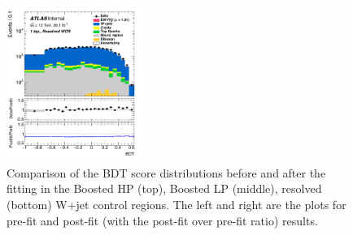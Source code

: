 \begin{figure}[!ht]
    \includegraphics[width=0.4\textwidth]{Chapter5/BDT_1lep_res_WCR_postfit.pdf}	
	\caption{\label{Fig:data_mc_vbs_wcr}
		Comparison of the BDT score distributions before and after the fitting in the  
		Boosted HP (top), Boosted LP (middle), resolved (bottom) W+jet control regions. The left and right are the plots for pre-fit and post-fit (with the post-fit over pre-fit ratio) results. 
	}
\end{figure}
